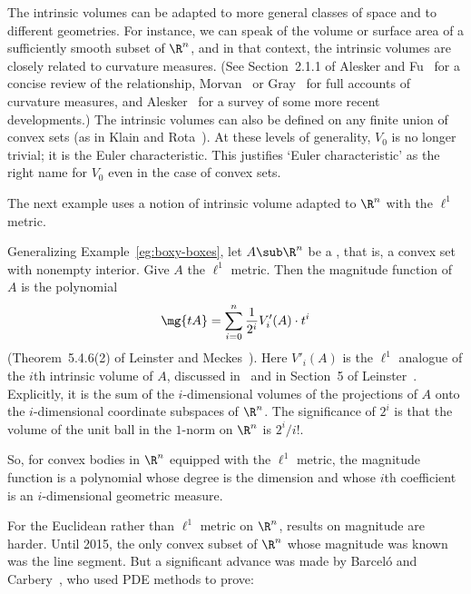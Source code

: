 The intrinsic volumes can be adapted to more general classes of space and
to different geometries.  For instance, we can speak of the volume or
surface area of a sufficiently smooth subset of $\R^n$, and in that
context, the intrinsic volumes are closely related to curvature measures.
(See Section~2.1.1 of Alesker and Fu~\cite{AlFu} for a concise review of
the relationship, Morvan~\cite{Morv} or Gray~\cite{GrayT} for full accounts
of curvature measures, and Alesker~\cite{AlesTVM} for a survey of some more
recent developments.)  The intrinsic volumes can also be defined on any
finite union of convex sets (as in Klain and Rota~\cite{KlRo}).  At these
levels of generality, $V_0$ is no longer trivial; it is the Euler
characteristic. This justifies `Euler%
%
%  
characteristic' as the right name for
$V_0$ even in the case of convex sets.

The next example uses a notion of
intrinsic volume adapted to $\R^n$ with the $\ell^1$ metric.

\begin{example}
% 
Generalizing Example~\ref{eg:boxy-boxes}, let $A \sub \R^n$ be a
, that is, a convex set with nonempty
interior.  Give $A$ the $\ell^1$ metric.  Then the magnitude function of
$A$ is the polynomial
\[
\mg{tA} 
=
\sum_{i = 0}^n \frac{1}{2^i} V'_i(A) \cdot t^i
\]
(Theorem~5.4.6(2) of Leinster and Meckes~\cite{MMSCG}).  Here
$V'_i(A)$%
% 
% 
is the $\ell^1$ analogue of the $i$th intrinsic volume of $A$, discussed
in~\cite{MMSCG} and in Section~5 of Leinster~\cite{IGON}.  Explicitly, it is
the sum of the $i$-dimensional volumes of the projections of $A$ onto the
$i$-dimensional coordinate subspaces of $\R^n$.  The significance of $2^i$
is that the volume of the unit ball in the $1$-norm on $\R^n$ is $2^i/i!$.

So, for convex bodies in $\R^n$ equipped with the $\ell^1$ metric, the
magnitude function is a polynomial whose degree is the dimension and whose
$i$th coefficient is an $i$-dimensional geometric measure.
\end{example}

For the Euclidean rather than $\ell^1$ metric on $\R^n$, results on
magnitude are harder.  Until 2015, the only convex subset of $\R^n$ whose
magnitude was known was the line segment.  But a significant advance was made
by Barcel\'o and Carbery~\cite{BaCa}, who used PDE methods to prove:

